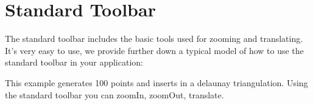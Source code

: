 \section{Standard Toolbar}
\label{Qt_widget_standard_toolbar}

The standard toolbar includes the basic tools used for zooming and translating.
It's very easy to use, we provide further down a typical model of how to use 
the standard toolbar in your application:


This example generates 100 points and inserts in a delaunay triangulation. Using the standard toolbar you can zoomIn, zoomOut, translate.








